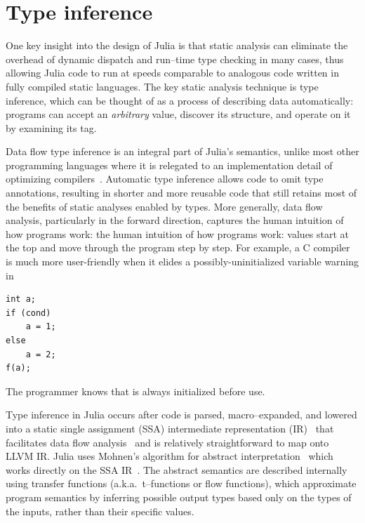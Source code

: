 \documentclass[pldi]{sigplanconf-pldi15}
\begin{document}
\section{Type inference}
\label{sec:inference}

One key insight into the design of Julia is that static analysis can eliminate
the overhead of dynamic dispatch and run--time type checking in many cases,
thus allowing Julia code to run at speeds comparable to analogous code written
in fully compiled static languages. The key static analysis technique is type
inference, which can be thought of as a process of describing data
automatically: programs can accept an \emph{arbitrary} value, discover its
structure, and operate on it by examining its tag.

Data flow type inference is an integral part of Julia's semantics, unlike most
other programming languages where it is relegated to an implementation detail
of optimizing compilers~\cite{Nielson2005,Khedker2009}. Automatic type
inference allows code to omit type annotations, resulting in shorter and more
reusable code that still retains most of the benefits of static analyses
enabled by types. More generally, data flow analysis, particularly in the
forward direction, captures the human intuition of how programs work: the human
intuition of how programs work: values start at the top and move through the
program step by step. For example, a C compiler is much more user-friendly when
it elides a possibly-uninitialized variable warning in

\begin{lstlisting}
int a;
if (cond)
    a = 1;
else
    a = 2;
f(a);
\end{lstlisting}
%
The programmer knows that  is always initialized before use.

Type inference in Julia occurs after code is parsed, macro--expanded, and
lowered into a static single assignment (SSA) intermediate representation
(IR)~\cite{Alpern1988,Rosen1988} that facilitates data flow
analysis~\cite{Cousot1977,Cousot2000,Nielson2005} and is relatively
straightforward to map onto LLVM IR. Julia uses Mohnen's algorithm
for abstract interpretation~\cite{Cousot1992} which works directly on the SSA
IR~\cite{Mohnen2002}. The abstract semantics are described internally using
transfer functions (a.k.a.\ t--functions or flow functions), which approximate
program semantics by inferring possible output types based only on the types of
the inputs, rather than their specific values. 
\end{document}
